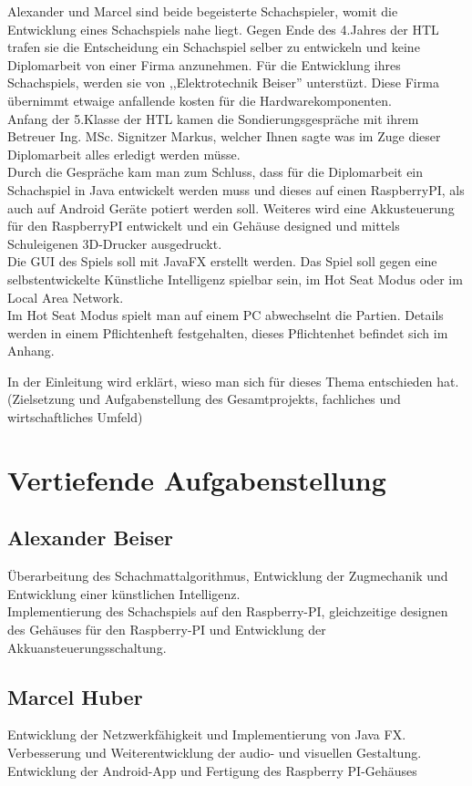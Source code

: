 \documentclass[12pt,a4paper]{article}
\newcommand{\yhbu}[0]{\color{ydkbu}}	%
\begin{document}
{	Alexander und Marcel sind beide begeisterte Schachspieler, womit die Entwicklung eines Schachspiels nahe liegt. Gegen Ende des 4.Jahres der HTL trafen sie die Entscheidung ein Schachspiel selber zu entwickeln und keine Diplomarbeit von einer Firma anzunehmen. Für die Entwicklung ihres Schachspiels, werden sie von ,,Elektrotechnik Beiser'' unterstüzt. Diese Firma übernimmt etwaige anfallende kosten für die Hardwarekomponenten.\\
	Anfang der 5.Klasse der HTL kamen die Sondierungsgespräche mit ihrem Betreuer Ing. MSc. Signitzer Markus, 
welcher Ihnen sagte was im Zuge dieser Diplomarbeit alles erledigt werden müsse. \\
Durch die Gespräche kam man zum Schluss, dass für die Diplomarbeit ein Schachspiel in Java entwickelt werden muss und dieses auf einen RaspberryPI, als auch auf Android Geräte potiert werden soll. Weiteres wird eine Akkusteuerung für den RaspberryPI entwickelt und ein Gehäuse designed und mittels Schuleigenen 3D-Drucker ausgedruckt. \\
	Die GUI des Spiels soll mit JavaFX erstellt werden. Das Spiel soll gegen eine selbstentwickelte Künstliche Intelligenz spielbar sein, im Hot Seat Modus oder im Local Area Network. \\
	Im Hot Seat Modus spielt man auf einem PC abwechselnt die Partien.
	Details werden in einem Pflichtenheft festgehalten, dieses Pflichtenhet befindet sich im Anhang.
	

	{\yhbu
	In der Einleitung wird erklärt,
	wieso man sich für dieses Thema entschieden hat.
	(Zielsetzung und Aufgabenstellung des Gesamtprojekts,
	fachliches und wirtschaftliches Umfeld)
	}
\section{\sc Vertiefende Aufgabenstellung}
 \subsection{Alexander Beiser}
 	Überarbeitung des Schachmattalgorithmus, Entwicklung der Zugmechanik und Entwicklung einer künstlichen Intelligenz. \\
Implementierung des Schachspiels auf den Raspberry-PI, gleichzeitige designen des Gehäuses für den Raspberry-PI und Entwicklung der Akkuansteuerungsschaltung. 
	
 \subsection{Marcel Huber}
	Entwicklung der Netzwerkfähigkeit und Implementierung von Java FX.
Verbesserung und Weiterentwicklung der audio- und visuellen Gestaltung.
Entwicklung der Android-App und Fertigung des Raspberry PI-Gehäuses


}
\end{document}
